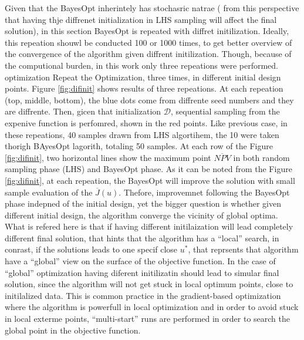\documentclass[]{elsarticle} %
\begin{document}
\begin{eqution}
Given that the BayesOpt inherintely has stochasric natrae ( from this perspective that having thje diffrenet initialization in LHS sampling will affect the final solution), in this section BayesOpt is repeated with diffret initilization. Ideally, this repeation shouwl be conducted 100 or 1000 times, to get better overview of the convergence of the algorithm given diffrent initilization. Though, because of the computional burden, in this work only three repeations were performed. optimization Repeat the Optimization, three times, in different initial design points. Figure \ref{fig:difinit} shows results of three repeations. At each repeation (top, middle, bottom), the blue dots come from diffrente seed numbers and they are diffrente. Then, gicen that initialization \(\mathcal{D}\), sequential sampling from the expenive function is perfomred, shown in the red points. Like previous case, in these repeations, 40 samples drawn from LHS algortihem, the 10 were taken thorigh BAyesOpt lagorith, totaling 50 samples. At each row of the Figure \ref{fig:difinit}, two horizontal lines show the maximum point \(\overline{NPV}\) in both random sampling phase (LHS) and BayesOpt phase. As it can be noted from the Figure \ref{fig:difinit}, at each repeation, the BayesOpt will improve the solution with small sample evaluation of the \(\overline{J}(u)\). Thefore, improvemnet following the BayesOpt phase indepned of the initial design, yet the bigger question is whether given different initial design, the algorithm converge the vicinity of global optima. What is refered here is that if having different initilaization will lead completely different final solution, that hints that the algorithm has a ``local'' search, in conrast, if the solutions leads to one specif close \(u^*\), that reprsents that algorithm have a ``global'' view on the surface of the objective function. In the case of ``global'' optimization having diferent initilizatin should lead to simular final solution, since the algorithm will not get stuck in local optimum points, close to initilalized data. This is common practice in the gradient-based optimization where the algorithm is powerfull in local optimization and in order to avoid stuck in local exterme points, ``multi-start'' runs are performed in order to search the global point in the objective function.

\begin{figure}


\end{figure}
\end{eqution}
\end{document}
